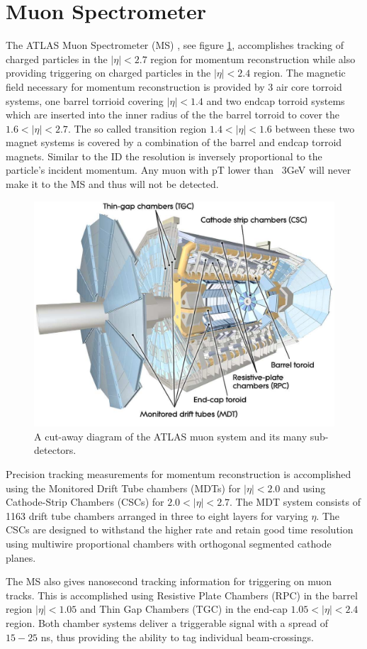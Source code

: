 \section{Muon Spectrometer} \label{sec:atlas:muons}

The ATLAS Muon Spectrometer (MS) \cite{PERF-2007-01}, see figure
\ref{fig:muon_system}, accomplishes tracking of charged particles in the $|\eta|
< 2.7$ region for momentum reconstruction while also providing triggering on
charged particles in the $|\eta| < 2.4$ region.  The magnetic field necessary
for momentum reconstruction is provided by 3 air core torroid systems, one
barrel torrioid covering $|\eta| < 1.4$ and two endcap torroid systems which are
inserted into the inner radius of the the barrel torroid to cover the $1.6 <
|\eta| < 2.7$. The so called transition region $1.4 < |\eta| < 1.6$ between
these two magnet systems is covered by a combination of the barrel and endcap
torroid magnets.  Similar to the ID the resolution is inversely proportional to
the particle's incident momentum.  Any muon with pT lower than ~3GeV will never
make it to the MS and thus will not be detected.  

\begin{figure}[!htbp]
  \begin{center}
    \includegraphics[width=0.8\linewidth]{figures/atlas/muon_system}
    \caption{ \cite{PERF-2007-01} A cut-away diagram of the ATLAS muon system
and its many sub-detectors.}
    \label{fig:muon_system}
  \end{center}
\end{figure}

Precision tracking measurements for momentum reconstruction is accomplished
using the Monitored Drift Tube chambers (MDTs) for $|\eta| < 2.0$ and using
Cathode-Strip Chambers (CSCs) for $2.0 < |\eta| < 2.7$.  The MDT system consists of
1163 drift tube chambers arranged in three to eight layers for varying $\eta$.
The CSCs are designed to withstand the higher rate and retain good time
resolution using multiwire proportional chambers with orthogonal segmented
cathode planes.

The MS also gives nanosecond tracking information for triggering on muon tracks.
This is accomplished using Resistive Plate Chambers (RPC) in the barrel region
$|\eta| < 1.05$ and Thin Gap Chambers (TGC) in the end-cap $1.05 < |\eta| < 2.4$
region.  Both chamber systems deliver a triggerable signal with a spread of
$15-25$ ns, thus providing the ability to tag individual beam-crossings.
